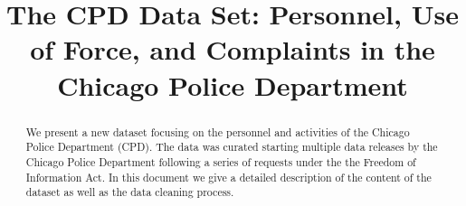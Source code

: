 \documentclass{article}
\title{The CPD Data Set: Personnel, Use of Force, and Complaints in the Chicago Police Department}
\begin{document}
\maketitle

\begin{abstract}
	We present a new dataset focusing on the personnel and activities of the
	Chicago Police Department (CPD). The data was curated starting multiple
	data releases by the Chicago Police Department following a series of
	requests under the the Freedom of Information Act. In this document we give
	a detailed description of the content of the dataset as well as the data
	cleaning process.
\end{abstract}










\end{document}
